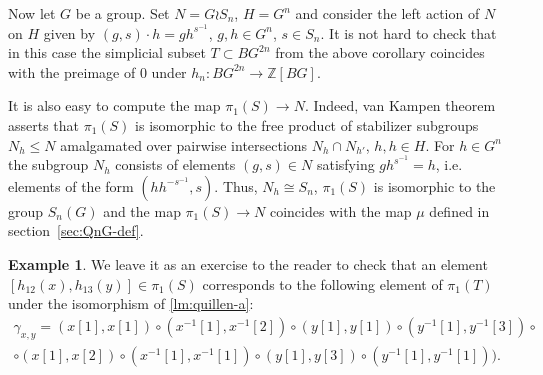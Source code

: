 \documentclass[oneside, 12pt]{amsart}
\theoremstyle{plain}
\numberwithin{equation}{section}
\numberwithin{lemma}{section}
\theoremstyle{remark}
\theoremstyle{definition}
\newtheorem{example}[lemma]{Example} \Crefname{example}{Example}{Examples}
\newcommand{\ZZ}{\mathbb{Z}}
\begin{document}
Now let $G$ be a group. Set $N = G \wr S_n$, $H = G^n$ and consider the left action of $N$ on $H$ given by $(g, s) \cdot h = gh^{s^{-1}}$, $g, h\in G^n$, $s\in S_n$.
It is not hard to check that in this case the simplicial subset $T \subset BG^{2n}$ from the above corollary
 coincides with the preimage of $0$ under $h_n \colon BG^{2n} \to \ZZ[BG]$.

It is also easy to compute the map $\pi_1(S) \to N$. Indeed, van Kampen theorem~\cite[Theorem~2.7]{May99} asserts that
$\pi_1(S)$ is isomorphic to the free product of stabilizer subgroups $N_{h} \leq N$ amalgamated over pairwise intersections $N_h \cap N_{h'}$, $h, h\in H$.
For $h \in G^n$ the subgroup $N_h$ consists of elements $(g, s) \in N$ satisfying $gh^{s^{-1}} = h$, i.e. elements of the form $(hh^{-s^{-1}}, s)$.
Thus, $N_h\cong S_n$, $\pi_1(S)$ is isomorphic to the group $S_n(G)$ and the map $\pi_1(S) \to N$ coincides with the map $\mu$ defined in section~\ref{sec:QnG-def}.

\begin{example} \label{ex44}
 We leave it as an exercise to the reader to check that an element $[h_{12}(x), h_{13}(y)] \in \pi_1(S)$ corresponds to the following element of $\pi_1(T)$
  under the isomorphism of \cref{lm:quillen-a}:
 \begin{multline} \label{eq:pathT}
  \gamma_{x,y} = (x[1], x[1]) \circ (x^{-1}[1], x^{-1}[2]) \circ (y[1], y[1]) \circ (y^{-1}[1], y^{-1}[3]) \circ \\ \circ (x[1], x[2]) \circ (x^{-1}[1], x^{-1}[1]) \circ (y[1], y[3]) \circ (y^{-1}[1], y^{-1}[1])).
 \end{multline}  
\end{example}
\end{document}
